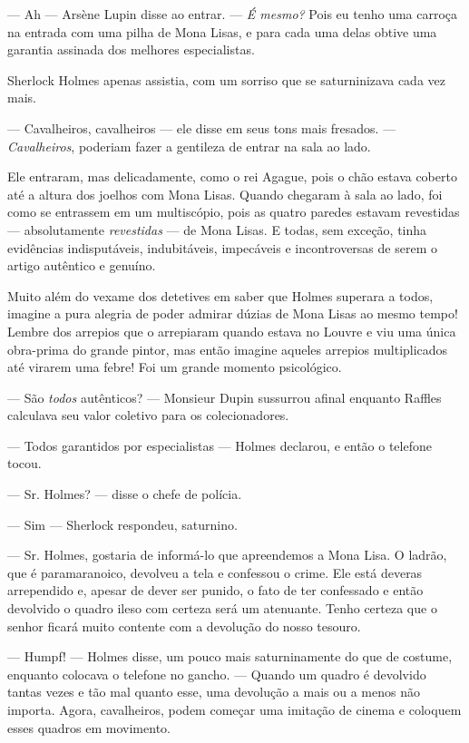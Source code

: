 --- Ah --- Arsène Lupin disse ao entrar. --- \emph{É mesmo?} Pois eu
tenho uma carroça na entrada com uma pilha de Mona Lisas, e para cada
uma delas obtive uma garantia assinada dos melhores especialistas.

Sherlock Holmes apenas assistia, com um sorriso que se saturninizava
cada vez mais.

--- Cavalheiros, cavalheiros --- ele disse em seus tons mais fresados.
--- \emph{Cavalheiros}, poderiam fazer a gentileza de entrar na sala ao
lado.

Ele entraram, mas delicadamente, como o rei Agague, pois o chão estava
coberto até a altura dos joelhos com Mona Lisas. Quando chegaram à sala
ao lado, foi como se entrassem em um multiscópio, pois as quatro paredes
estavam revestidas --- absolutamente \emph{revestidas} --- de Mona
Lisas. E todas, sem exceção, tinha evidências indisputáveis,
indubitáveis, impecáveis e incontroversas de serem o artigo autêntico e
genuíno.

Muito além do vexame dos detetives em saber que Holmes superara a todos,
imagine a pura alegria de poder admirar dúzias de Mona Lisas ao mesmo
tempo! Lembre dos arrepios que o arrepiaram quando estava no Louvre e
viu uma única obra-prima do grande pintor, mas então imagine aqueles
arrepios multiplicados até virarem uma febre! Foi um grande momento
psicológico.

--- São \emph{todos} autênticos? --- Monsieur Dupin sussurrou afinal
enquanto Raffles calculava seu valor coletivo para os colecionadores.

--- Todos garantidos por especialistas --- Holmes declarou, e então o
telefone tocou.

--- Sr. Holmes? --- disse o chefe de polícia.

--- Sim --- Sherlock respondeu, saturnino.

--- Sr. Holmes, gostaria de informá-lo que apreendemos a Mona Lisa. O
ladrão, que é paramaranoico, devolveu a tela e confessou o crime. Ele
está deveras arrependido e, apesar de dever ser punido, o fato de ter
confessado e então devolvido o quadro ileso com certeza será um
atenuante. Tenho certeza que o senhor ficará muito contente com a
devolução do nosso tesouro.

--- Humpf! --- Holmes disse, um pouco mais saturninamente do que de
costume, enquanto colocava o telefone no gancho. --- Quando um quadro é
devolvido tantas vezes e tão mal quanto esse, uma devolução a mais ou a
menos não importa. Agora, cavalheiros, podem começar uma imitação de
cinema e coloquem esses quadros em movimento.

